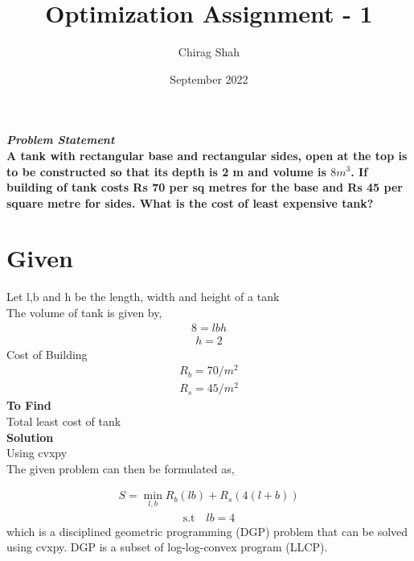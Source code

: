 \documentclass[journal,10pt,twocolumn]{article}
\title{\textbf{Optimization Assignment - 1}}
\author{Chirag Shah}
\date{September 2022}
\begin{document}
\maketitle
\paragraph{\textit{Problem Statement}\vspace{1mm}\\  A tank with rectangular base and rectangular sides, open at the top is to be constructed so that its depth is 2 m and volume is $8 m^3$. If building of tank costs Rs 70 per sq metres for the base and Rs 45 per square metre for sides. What is the cost of least expensive tank?} 
\section*{\large Given}



Let l,b and h be the length, width and height of a tank   \\\vspace{1mm}
The volume of tank is given by,
\begin{align}
8 = lbh
\end{align}
\begin{align}
h=2
\end{align}
Cost of Building  \\ \vspace{1mm}
\begin{align}
R_b = 70/m^2
\end{align}
\begin{align}
R_s = 45/m^2
\end{align}
\textbf{To Find }\vspace{2mm}\\
Total least cost of tank\vspace{2mm}  \\ 
\textbf{Solution}\vspace{2mm}\\
Using cvxpy \\ \vspace{4mm}
The given problem can then be formulated as,\\ \vspace{1mm}

\begin{align}
S= \min_{l,b} R_b(lb)+R_s(4(l+b))
\end{align}
\begin{align}
\text{s.t} \quad lb=4
\end{align}
which is a disciplined geometric programming (DGP) problem that can be solved using cvxpy. DGP is a subset of log-log-convex program (LLCP). 
\end{document}
